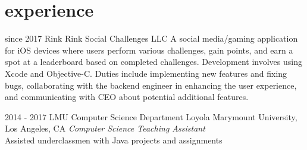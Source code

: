 \documentclass[]{friggeri-cv} %
\begin{document}

\section{experience}

  \begin{entrylist}
  

   \entry
      {since 2017}
      {Rink}
      {Rink Social Challenges LLC}
      {A social media/gaming application for iOS devices where users perform various challenges, gain points, and earn a spot at a leaderboard based on completed challenges. Development involves using Xcode and Objective-C. Duties include implementing new features and fixing bugs, collaborating with the backend engineer in enhancing the user experience, and communicating with CEO about potential additional features.}


	  



    \entry
      {2014 - 2017}
      {LMU Computer Science Department}
      {Loyola Marymount University, Los Angeles, CA}
      {\emph{Computer Science Teaching Assistant} \\
        Assisted underclassmen with Java projects and assignments}


\end{entrylist}
\end{document}
